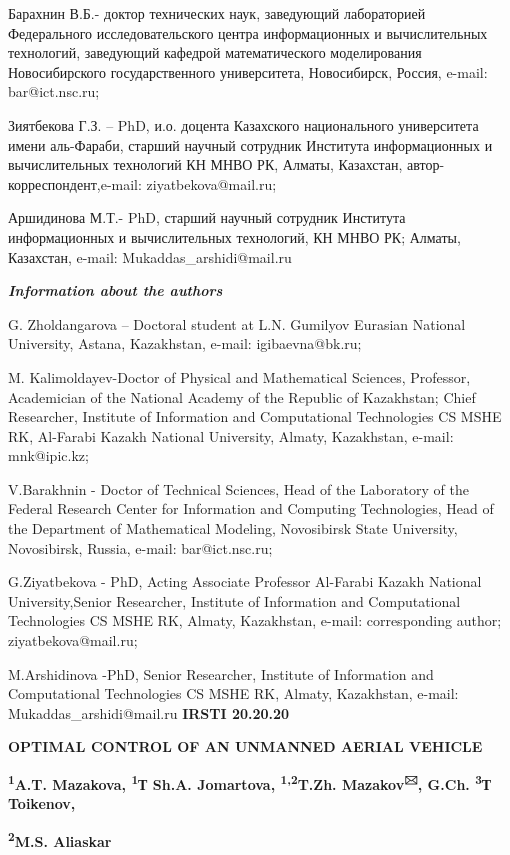 Барахнин В.Б.- доктор технических наук, заведующий лабораторией
Федерального исследовательского центра информационных и вычислительных
технологий, заведующий кафедрой математического моделирования
Новосибирского государственного университета, Новосибирск, Россия,
e-mail: bar@ict.nsc.ru;

Зиятбекова Г.З. -- PhD, и.о. доцента Казахского национального
университета имени аль-Фараби, старший научный сотрудник Института
информационных и вычислительных технологий КН МНВО РК, Алматы,
Казахстан, автор-корреспондент,e-mail: ziyatbekova@mail.ru;

Аршидинова М.Т.- PhD, старший научный сотрудник Института информационных
и вычислительных технологий, КН МНВО РК; Алматы, Казахстан, e-mail:
Mukaddas\_arshidi@mail.ru

\emph{{\bfseries Information about the authors}}

G. Zholdangarova -- Doctoral student at L.N. Gumilyov Eurasian National
University, Astana, Kazakhstan, e-mail: igibaevna@bk.ru;

M. Kalimoldayev-Doctor of Physical and Mathematical Sciences, Professor,
Academician of the National Academy of the Republic of Kazakhstan; Chief
Researcher, Institute of Information and Computational Technologies CS
MSHE RK, Al-Farabi Kazakh National University, Almaty, Kazakhstan,
e-mail: mnk@ipic.kz;

V.Barakhnin - Doctor of Technical Sciences, Head of the Laboratory of
the Federal Research Center for Information and Computing Technologies,
Head of the Department of Mathematical Modeling, Novosibirsk State
University, Novosibirsk, Russia, e-mail: bar@ict.nsc.ru;

G.Ziyatbekova - PhD, Acting Associate Professor Al-Farabi Kazakh
National University,Senior Researcher, Institute of Information and
Computational Technologies CS MSHE RK, Almaty, Kazakhstan, e-mail:
corresponding author; ziyatbekova@mail.ru;

M.Arshidinova -PhD, Senior Researcher, Institute of Information and
Computational Technologies CS MSHE RK, Almaty, Kazakhstan, e-mail:
Mukaddas\_arshidi@mail.ru\newpage
{\bfseries IRSTI 20.20.20}

{\bfseries OPTIMAL CONTROL OF AN UNMANNED AERIAL VEHICLE}

{\bfseries \textsuperscript{1}A.T. Mazakova, \textsuperscript{1}Т Sh.A.
Jomartova, \textsuperscript{1,2}T.Zh. Mazakov\textsuperscript{🖂}, G.Ch.
\textsuperscript{3}Т Toikenov,}

{\bfseries \textsuperscript{2}M.S. Aliaskar}

